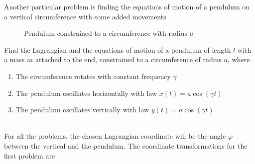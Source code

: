 \documentclass[../admech.tex]{subfiles}
\begin{document}
\begin{exe}
	Another particular problem is finding the equations of motion of a pendulum on a vertical circumference with some added movements\\
	\begin{minipage}[c]{0.5\textwidth}
		\begin{figure}[H]
			\centering
			\caption{Pendulum constrained to a circumference with radius $a$}
			\label{fig:circpend}
		\end{figure}
	\end{minipage}
	\begin{minipage}[r]{0.5\textwidth}
		Find the Lagrangian and the equations of motion of a pendulum of length $l$ with a mass $m$ attached to the end, constrained to a circumference of radius $a$, where
		\begin{enumerate}
		\item The circumference rotates with constant frequency $\gamma$
		\item The pendulum oscillates horizontally with law $x(t)=a\cos(\gamma t)$
		\item The pendulum oscillates vertically with law $y(t)=a\cos(\gamma t)$
		\end{enumerate}
	\end{minipage}\\
	For all the problems, the chosen Lagrangian coordinate will be the angle $\varphi$ between the vertical and the pendulum. The coordinate transformations for the first problem are

\end{exe}
\end{document}
